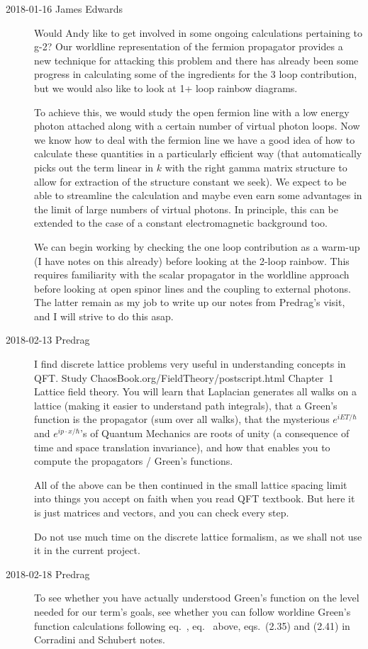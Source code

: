 \begin{description}
\item[2018-01-16 James Edwards ]
Would Andy like to get involved in some ongoing calculations pertaining
to g-2? Our worldline representation of the fermion propagator provides a
new technique for attacking this problem and there has already been some
progress in calculating some of the ingredients for the 3 loop
contribution, but we would also like to look at 1+ loop rainbow diagrams.

To achieve this, we would study the open fermion line with a low energy
photon attached along with a certain number of virtual photon loops.
Now we know how to deal with the fermion line we have a good idea
of how to calculate these quantities in a particularly efficient way
(that automatically picks out the term linear in $k$ with the right gamma
matrix structure to allow for extraction of the structure constant we
seek). We expect to be able to streamline the calculation  and maybe even
earn some advantages in the limit of large numbers of virtual photons. In
principle, this can be extended to the case of a constant electromagnetic
background too.

We can begin working by checking the one loop contribution as a warm-up
(I have notes on this already) before looking at the 2-loop rainbow. This
requires familiarity with the scalar propagator in the worldline approach
before looking at open spinor lines and the coupling to external photons.
The latter remain as my job to write up our notes from Predrag's visit,
and I will strive to do this asap.

\item[2018-02-13 Predrag]
    I find discrete lattice problems very useful in understanding
    concepts in QFT. Study
    {ChaosBook.org/FieldTheory/postscript.html} Chapter~1 {Lattice field
    theory}. You will learn that Laplacian generates all walks on a
    lattice (making it easier to understand path integrals), that a
    Green's function is the propagator (sum over all walks), that the
    mysterious $e^{iET/\hbar}$ and $e^{ip\cdot{x}/\hbar}$'s of Quantum
    Mechanics are roots of unity (a consequence of time and space
    translation invariance), and how that enables you to compute the
    propagators / Green's functions.

    All of the above can be then continued in the small lattice spacing
    limit into things you accept on faith when you read QFT textbook.
    But here it is just matrices and vectors, and you can check every
    step.

    Do not use much time on the discrete lattice formalism, as we shall
    not use it in the current project.

\item[2018-02-18 Predrag] To see whether you have actually understood
Green's function on the level needed for our term's goals, see whether
you can follow worldine Green's function calculations following
eq.~, eq.~ above, eqs.~(2.35)
and (2.41) in Corradini and Schubert notes.

\end{description}

\printbibliography[heading=subbibintoc,title={References}]


\renewcommand{\ssp}{a}
